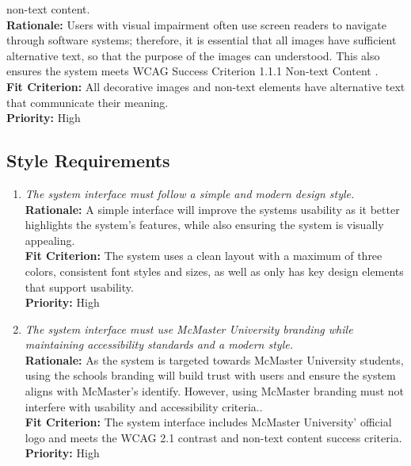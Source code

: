\documentclass[12pt]{article}
\begin{document}
\begin{enumerate}[label=LFR-AR \arabic*., wide=0pt, leftmargin=*]
{    non-text content.}\\[2mm]
    {\bf Rationale:} Users with visual impairment often use screen
    readers to navigate through software systems; therefore, it is
    essential that all images have sufficient alternative text, so
    that the purpose of the images can understood. This also ensures
    the system meets WCAG Success Criterion 1.1.1 Non-text Content  .\\
    {\bf Fit Criterion:} All decorative images and non-text elements
    have alternative text that communicate their meaning. \\
    {\bf Priority:} High
\end{enumerate}

\subsection{Style Requirements}
\begin{enumerate}[label=LFR-SR \arabic*., wide=0pt, leftmargin=*]
  \item \emph{The system interface must follow a simple and modern
    design style.}\\[2mm]
    {\bf Rationale:} A simple interface will improve the systems
    usability as it better highlights the system's features, while
    also ensuring the system is visually appealing.\\
    {\bf Fit Criterion:} The system uses a clean layout with a
    maximum of three colors, consistent font styles and sizes, as
    well as only has key design elements that support usability. \\
    {\bf Priority:} High
  \item \emph{The system interface must use McMaster University
      branding while maintaining accessibility standards and a modern
    style.}\\[2mm]
    {\bf Rationale:} As the system is targeted towards McMaster
    University students, using the schools branding will build trust
    with users and ensure the system aligns with McMaster's identify.
    However, using McMaster branding must not interfere with
    usability and accessibility criteria..\\
    {\bf Fit Criterion:} The system interface includes McMaster
    University' official logo and meets the WCAG 2.1 contrast and
    non-text content success criteria. \\
    {\bf Priority:} High
\end{enumerate}
\end{document}
